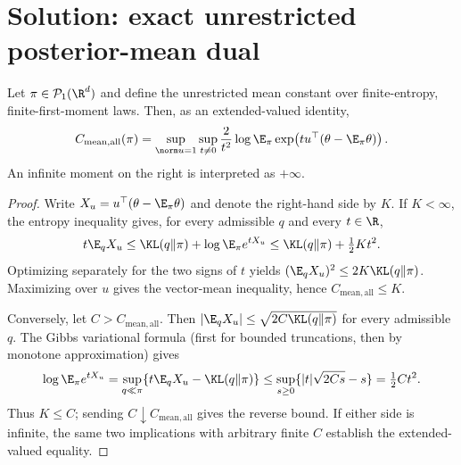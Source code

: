 \documentclass[../main.tex]{subfiles}
\begin{document}

\section*{Solution: exact unrestricted posterior-mean dual}

\begin{theorem}
Let $\pi\in\mathcal P_1(\R^d)$ and define the unrestricted mean constant over finite-entropy,
finite-first-moment laws. Then, as an extended-valued identity,
\[
 C_{\mathrm{mean},\mathrm{all}}(\pi)
 =\sup_{\norm u=1}\sup_{t\ne0}\frac{2}{t^2}
 \log\E_\pi\exp\!\left(tu^\top(\theta-\E_\pi\theta)\right).
\]
An infinite moment on the right is interpreted as $+\infty$.
\end{theorem}

\begin{proof}
Write $X_u=u^\top(\theta-\E_\pi\theta)$ and denote the right-hand side by $K$. If $K<\infty$,
the entropy inequality gives, for every admissible $q$ and every $t\in\R$,
\[
 t\E_qX_u\le\KL(q\|\pi)+\log\E_\pi e^{tX_u}
 \le\KL(q\|\pi)+\tfrac12Kt^2.
\]
Optimizing separately for the two signs of $t$ yields
$(\E_qX_u)^2\le2K\KL(q\|\pi)$. Maximizing over $u$ gives the vector-mean inequality, hence
$C_{\mathrm{mean},\mathrm{all}}\le K$.

Conversely, let $C>C_{\mathrm{mean},\mathrm{all}}$. Then
$|\E_qX_u|\le\sqrt{2C\KL(q\|\pi)}$ for every admissible $q$. The Gibbs variational formula
(first for bounded truncations, then by monotone approximation) gives
\[
 \log\E_\pi e^{tX_u}
 =\sup_{q\ll\pi}\{t\E_qX_u-\KL(q\|\pi)\}
 \le\sup_{s\ge0}\{|t|\sqrt{2Cs}-s\}=\tfrac12Ct^2.
\]
Thus $K\le C$; sending $C\downarrow C_{\mathrm{mean},\mathrm{all}}$ gives the reverse bound.
If either side is infinite, the same two implications with arbitrary finite $C$ establish the
extended-valued equality.
\end{proof}
\end{document}
